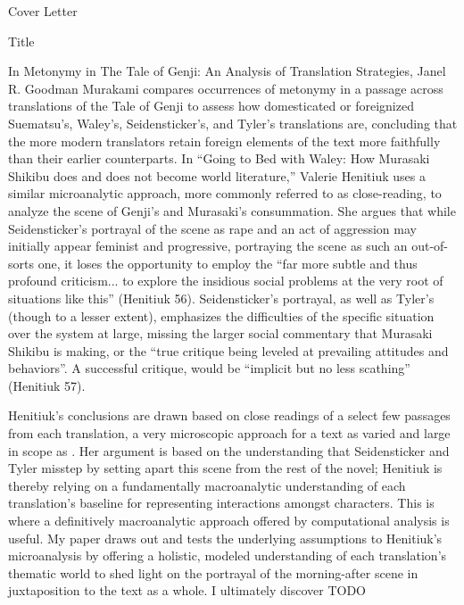 \documentclass[12pt]{article}
\newenvironment{coverletter}{\begin{center} Cover Letter \end{center}}{\newpage }
\begin{document}
\begin{flushleft}
\begin{spacing}{2.0}
\begin{coverletter}
\end{coverletter}


\begin{center}
Title
\end{center}

\setlength{\parindent}{0.5in}

In Metonymy in The Tale of Genji: An Analysis of Translation Strategies, Janel R. Goodman Murakami compares occurrences of metonymy in a passage across translations of the Tale of Genji to assess how domesticated or foreignized Suematsu's, Waley's, Seidensticker's, and Tyler's translations are, concluding that the more modern translators retain foreign elements of the text more faithfully than their earlier counterparts. In ``Going to Bed with Waley: How Murasaki Shikibu does and does not become world literature,'' Valerie Henitiuk uses a similar microanalytic approach, more commonly referred to as close-reading, to analyze the scene of Genji's and Murasaki's consummation. She argues that while Seidensticker's  portrayal of the scene as rape and an act of aggression may initially appear feminist and progressive, portraying the scene as such an out-of-sorts one, it loses the opportunity to employ the ``far more subtle and thus profound criticism... to explore the insidious social problems at the very root of situations like this'' (Henitiuk 56). Seidensticker's portrayal, as well as Tyler's (though to a lesser extent), emphasizes the difficulties of the specific situation over the system at large, missing the larger social commentary that Murasaki Shikibu is making, or the ``true critique being leveled at prevailing attitudes and behaviors''. A successful critique, would be ``implicit but no less scathing'' (Henitiuk 57).

Henitiuk's conclusions are drawn based on close readings of a select few passages from each translation, a very microscopic approach for a text as varied and large in scope as . Her argument is based on the understanding that Seidensticker and Tyler misstep by setting apart this scene from the rest of the novel; Henitiuk is thereby relying on a fundamentally macroanalytic understanding of each translation's baseline for representing interactions amongst characters. This is where a definitively macroanalytic approach offered by computational analysis is useful. My paper draws out and tests the underlying assumptions to Henitiuk's microanalysis by offering a holistic, modeled understanding of each translation's thematic world to shed light on the portrayal of the morning-after scene in juxtaposition to the text as a whole. I ultimately discover TODO


\end{spacing}
\end{flushleft}
\end{document}
